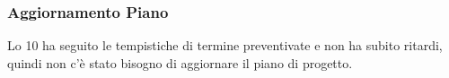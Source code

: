 \subsubsection{Aggiornamento Piano}
\label{sec:aggiornamento_piano_sprint10}
Lo  10 ha seguito le tempistiche di termine preventivate e non ha subito ritardi, quindi non c'è stato bisogno di aggiornare il piano di progetto.